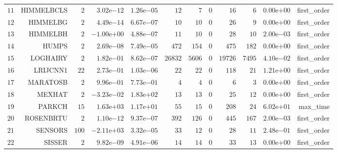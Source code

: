 \begin{longtable}{rrrrrrrrrrrr}
  \(    11\) & HIMMELBCLS & \(     2\) & \( 3.02\)e\(-12\) & \( 1.26\)e\(-05\) & \(    12\) & \(     7\) & \(     0\) & \(    16\) & \(     6\) & \( 0.00\)e\(+00\) & first\_order \\
  \(    12\) & HIMMELBG & \(     2\) & \( 4.49\)e\(-14\) & \( 6.67\)e\(-07\) & \(    10\) & \(    10\) & \(     0\) & \(    26\) & \(     9\) & \( 0.00\)e\(+00\) & first\_order \\
  \(    13\) & HIMMELBH & \(     2\) & \(-1.00\)e\(+00\) & \( 4.88\)e\(-07\) & \(    11\) & \(    10\) & \(     0\) & \(    28\) & \(    10\) & \( 2.00\)e\(-03\) & first\_order \\
  \(    14\) & HUMPS & \(     2\) & \( 2.69\)e\(-08\) & \( 7.49\)e\(-05\) & \(   472\) & \(   154\) & \(     0\) & \(   475\) & \(   182\) & \( 0.00\)e\(+00\) & first\_order \\
  \(    15\) & LOGHAIRY & \(     2\) & \( 1.82\)e\(-01\) & \( 8.62\)e\(-07\) & \( 26832\) & \(  5606\) & \(     0\) & \( 19726\) & \(  7495\) & \( 4.10\)e\(-02\) & first\_order \\
  \(    16\) & LRIJCNN1 & \(    22\) & \( 2.73\)e\(-01\) & \( 1.03\)e\(-06\) & \(    22\) & \(    22\) & \(     0\) & \(   118\) & \(    21\) & \( 1.21\)e\(+00\) & first\_order \\
  \(    17\) & MARATOSB & \(     2\) & \( 9.96\)e\(-01\) & \( 7.73\)e\(-01\) & \(     4\) & \(     4\) & \(     0\) & \(     6\) & \(     3\) & \( 0.00\)e\(+00\) & first\_order \\
  \(    18\) & MEXHAT & \(     2\) & \(-3.23\)e\(-02\) & \( 1.83\)e\(+02\) & \(    13\) & \(    13\) & \(     0\) & \(    25\) & \(    12\) & \( 0.00\)e\(+00\) & first\_order \\
  \(    19\) & PARKCH & \(    15\) & \( 1.63\)e\(+03\) & \( 1.17\)e\(+01\) & \(    55\) & \(    15\) & \(     0\) & \(   208\) & \(    24\) & \( 6.02\)e\(+01\) & max\_time \\
  \(    20\) & ROSENBRTU & \(     2\) & \( 1.10\)e\(-12\) & \( 9.37\)e\(-07\) & \(   392\) & \(   126\) & \(     0\) & \(   445\) & \(   167\) & \( 2.00\)e\(-03\) & first\_order \\
  \(    21\) & SENSORS & \(   100\) & \(-2.11\)e\(+03\) & \( 3.32\)e\(-05\) & \(    33\) & \(    12\) & \(     0\) & \(    28\) & \(    11\) & \( 2.48\)e\(-01\) & first\_order \\
  \(    22\) & SISSER & \(     2\) & \( 9.82\)e\(-09\) & \( 4.91\)e\(-06\) & \(    14\) & \(    14\) & \(     0\) & \(    33\) & \(    13\) & \( 0.00\)e\(+00\) & first\_order \\

\end{longtable}

